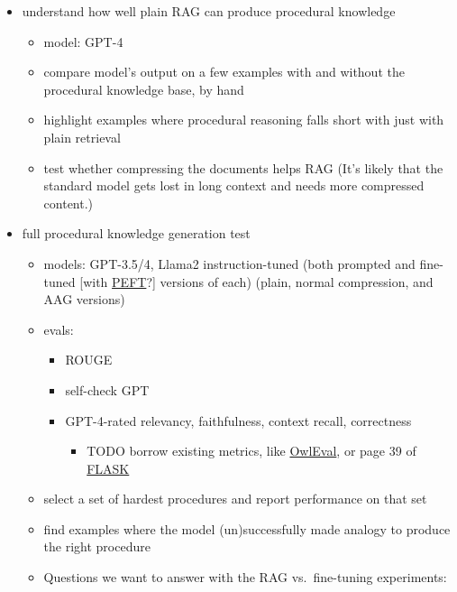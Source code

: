 \documentclass{article}
\begin{document}
\begin{itemize}
   \item understand how well plain RAG can produce procedural knowledge
         \begin{itemize}
            \item model: GPT-4
            \item compare model's output on a few examples with and without the procedural knowledge base, by hand
            \item highlight examples where procedural reasoning falls short with just with plain retrieval
            \item test whether compressing the documents helps RAG (It's likely that the standard model gets lost in long context and needs more compressed content.)
         \end{itemize}
   \item full procedural knowledge generation test
         \begin{itemize}
            \item models: GPT-3.5/4, Llama2 instruction-tuned (both prompted and fine-tuned [with \href{https://huggingface.co/docs/peft/index}{PEFT}?] versions of each) (plain, normal compression, and AAG versions)
            \item evals:
                  \begin{itemize}
                     \item ROUGE
                     \item self-check GPT
                     \item GPT-4-rated relevancy, faithfulness, context recall, correctness
                           \begin{itemize}
                              \item TODO borrow existing metrics, like \href{https://github.com/X-PLUG/mPLUG-Owl/blob/main/OwlEval/OwlEval.md}{OwlEval}, or page 39 of \href{https://arxiv.org/pdf/2307.10928.pdf}{FLASK}
                           \end{itemize}
                  \end{itemize}
            \item select a set of hardest procedures and report performance on that set
            \item find examples where the model (un)successfully made analogy to produce the right procedure
            \item Questions we want to answer with the RAG vs.~fine-tuning experiments:

\end{itemize}
\end{itemize}
\end{document}
